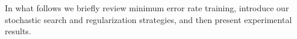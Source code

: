 \documentclass[11pt]{article}
\begin{document}
In what follows we briefly review minimum error rate training, introduce our stochastic search and regularization strategies, and then present experimental results. 






\end{document}
